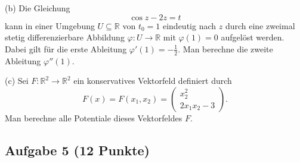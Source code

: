\vspace{1ex}

(b) Die Gleichung
\[
\cos z - 2z = t
\]
kann in einer Umgebung \(U\subseteq\mathbb{R}\) von \(t_0=1\) eindeutig nach \(z\) durch eine zweimal stetig differenzierbare Abbildung \(\varphi:U\to\mathbb{R}\) mit \(\varphi(1)=0\) aufgelöst werden. Dabei gilt für die erste Ableitung \(\varphi'(1)=-\tfrac{1}{2}\).
Man berechne die zweite Ableitung \(\varphi''(1)\). 
\hfill {}


\vspace{1ex}

(c) Sei \(F:\mathbb{R}^2\to\mathbb{R}^2\) ein konservatives Vektorfeld definiert durch
\[
F(x)=F(x_1,x_2)=\begin{pmatrix} x_2^2 \\[4pt] 2x_1x_2-3 \end{pmatrix}.
\]
Man berechne alle Potentiale dieses Vektorfeldes \(F\). 
\hfill {}


\newpage
\subsection*{Aufgabe 5 (12 Punkte)}

